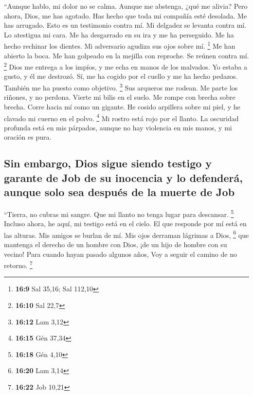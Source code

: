\begin{paracol}{2}
 ``Aunque hablo, mi dolor no se calma. Aunque me abstenga,
¿qué me alivia?  Pero ahora, Dios, me has agotado. Has
hecho que toda mi compañía esté desolada.  Me has
arrugado. Esto es un testimonio contra mí. Mi delgadez se levanta contra
mí. Lo atestigua mi cara.  Me ha desgarrado en su ira y me
ha perseguido. Me ha hecho rechinar los dientes. Mi adversario agudiza
sus ojos sobre mí. \footnote{\textbf{16:9} Sal 35,16; Sal 112,10}
 Me han abierto la boca. Me han golpeado en la mejilla
con reproche. Se reúnen contra mí. \footnote{\textbf{16:10} Sal 22,7}
 Dios me entrega a los impíos, y me echa en manos de los
malvados.  Yo estaba a gusto, y él me destrozó. Sí, me ha
cogido por el cuello y me ha hecho pedazos. También me ha puesto como
objetivo. \footnote{\textbf{16:12} Lam 3,12}  Sus
arqueros me rodean. Me parte los riñones, y no perdona. Vierte mi bilis
en el suelo.  Me rompe con brecha sobre brecha. Corre
hacia mí como un gigante.  He cosido arpillera sobre mi
piel, y he clavado mi cuerno en el polvo. \footnote{\textbf{16:15} Gén
  37,34}  Mi rostro está rojo por el llanto. La oscuridad
profunda está en mis párpados,  aunque no hay violencia
en mis manos, y mi oración es pura.

\hypertarget{sin-embargo-dios-sigue-siendo-testigo-y-garante-de-job-de-su-inocencia-y-lo-defenderuxe1-aunque-solo-sea-despuuxe9s-de-la-muerte-de-job}{%
\subsection{Sin embargo, Dios sigue siendo testigo y garante de Job de
su inocencia y lo defenderá, aunque solo sea después de la muerte de
Job}\label{sin-embargo-dios-sigue-siendo-testigo-y-garante-de-job-de-su-inocencia-y-lo-defenderuxe1-aunque-solo-sea-despuuxe9s-de-la-muerte-de-job}}

 ``Tierra, no cubras mi sangre. Que mi llanto no tenga
lugar para descansar. \footnote{\textbf{16:18} Gén 4,10} 
Incluso ahora, he aquí, mi testigo está en el cielo. El que responde por
mí está en las alturas.  Mis amigos se burlan de mí. Mis
ojos derraman lágrimas a Dios, \footnote{\textbf{16:20} Lam 3,14}
 que mantenga el derecho de un hombre con Dios, ¡de un
hijo de hombre con su vecino!  Para cuando hayan pasado
algunos años, Voy a seguir el camino de no retorno. \footnote{\textbf{16:22}
  Job 10,21}


\end{paracol}
